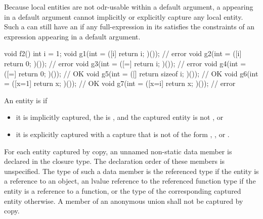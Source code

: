 \pnum
\begin{note}
Because local entities are not
odr-usable within a default argument,
a  appearing in a default argument
cannot implicitly or explicitly capture any local entity.
Such a 
can still have an  if
any full-expression in its 
satisfies the constraints of an expression appearing in
a default argument.
\end{note}
\begin{example}
\begin{codeblock}
void f2() {
  int i = 1;
  void g1(int = ([i]{ return i; })());          // error
  void g2(int = ([i]{ return 0; })());          // error
  void g3(int = ([=]{ return i; })());          // error
  void g4(int = ([=]{ return 0; })());          // OK
  void g5(int = ([]{ return sizeof i; })());    // OK
  void g6(int = ([x=1]{ return x; })());        // OK
  void g7(int = ([x=i]{ return x; })());        // error
}
\end{codeblock}
\end{example}

\pnum
An entity is  if
\begin{itemize}
\item
it is implicitly captured,
the  is \tcode{=}, and
the captured entity is not , or
\item
it is explicitly captured with a capture that is not of the form
,
\tcode{\&}  , or
\tcode{\&}   .
\end{itemize}
For each entity captured by copy, an
unnamed non-static data member is declared in the closure type. The declaration order of
these members is unspecified. The type of such a data member is
the referenced type if the entity is a reference to an object,
an lvalue reference to the referenced function type if the entity is a reference to a function, or
the type of the corresponding captured entity otherwise.
A member of an anonymous union shall not be captured by copy.

